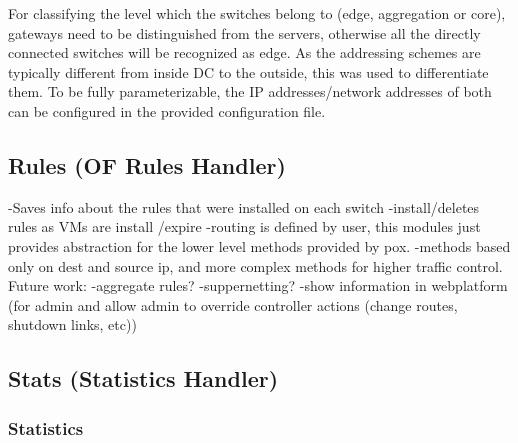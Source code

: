 \documentclass[12pt,english,oneside]{book}
\begin{document}
For classifying the level which the switches belong to (edge, aggregation or core), gateways need to be distinguished from the servers, otherwise all the directly connected switches will be recognized as edge. As the addressing schemes are typically different from inside DC to the outside, this was used to differentiate them. To be fully parameterizable, the IP addresses/network addresses of both can be configured in the provided configuration file.

\subsection{Rules (OF Rules Handler)}
\hspace{0.6cm}

-Saves info about the rules that were installed on each switch
-install/deletes rules as VMs are install /expire
-routing is defined by user, this modules just provides abstraction for the lower level methods provided by pox.
-methods based only on dest and source ip, and more complex methods for higher traffic control.
Future work:
-aggregate rules?
-suppernetting?
-show information in webplatform (for admin and allow admin to override controller actions (change routes, shutdown links, etc))

\subsection{Stats (Statistics Handler)}

\subsubsection{Statistics}
\hspace{0.6cm}
\end{document}
